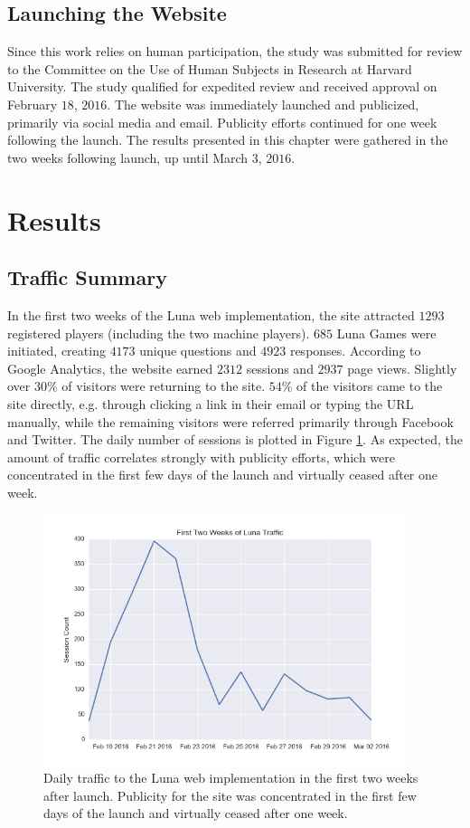 \subsection{Launching the Website}

Since this work relies on human participation, the study was submitted for review to the Committee on the Use of Human Subjects in Research at Harvard University. The study qualified for expedited review and received approval on February $18$, $2016$. The website was immediately launched and publicized, primarily via social media and email. Publicity efforts continued for one week following the launch. The results presented in this chapter were gathered in the two weeks following launch, up until March $3$, $2016$. 

\section{Results}

\subsection{Traffic Summary}

In the first two weeks of the Luna web implementation, the site attracted $1293$ registered players (including the two machine players). $685$ Luna Games were initiated, creating $4173$ unique questions and $4923$ responses. According to Google Analytics, the website earned $2312$ sessions and $2937$ page views. Slightly over $30$\% of visitors were returning to the site. $54$\% of the visitors came to the site directly, e.g. through clicking a link in their email or typing the URL manually, while the remaining visitors were referred primarily through Facebook and Twitter. The daily number of sessions is plotted in Figure \ref{trafficplot}. As expected, the amount of traffic correlates strongly with publicity efforts, which were concentrated in the first few days of the launch and virtually ceased after one week.

\begin{figure}
\includegraphics[width=0.95\textwidth]{figures/trafficPlot.png}
\caption{Daily traffic to the Luna web implementation in the first two weeks after launch. Publicity for the site was concentrated in the first few days of the launch and virtually ceased after one week.}
\label{trafficplot}
\end{figure}

